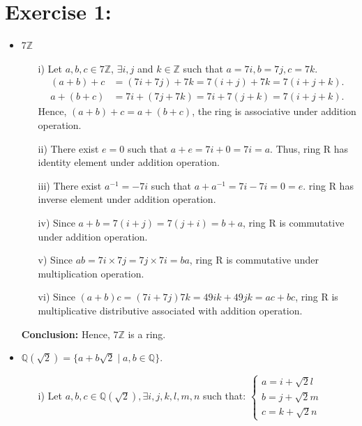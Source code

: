 \documentclass{article}
\newcommand{\Z}{\mathbb{Z}}
\newcommand{\Q}{\mathbb{Q}}
\begin{document}
	\section{Exercise 1:}
		\begin{itemize}
			\item 7$\Z$ \\
				\begin{enumerate}
					\item [i) ]
						Let $a, b, c \in 7\Z$, $\exists i, j$ and $k \in \Z$ such that $a = 7i, b = 7j, c = 7k$.
						\begin{align*}
							(a + b) + c &= (7i + 7j) + 7k = 7(i+j) + 7k = 7(i+j+k).\\
							a + (b + c) &= 7i + (7j + 7k) = 7i + 7(j+k) = 7(i+j+k).
						\end{align*}
						Hence, $(a + b) + c = a + (b + c)$, the ring is associative under addition operation.
					\item [ii)]
						There exist $e=0$ such that $a + e = 7i + 0 = 7i = a$. Thus, ring R has identity element under addition operation.
					\item [iii)]
						There exist $a^{-1} = -7i$ such that $a + a^{-1} = 7i - 7i = 0 = e$. ring R has inverse element under addition operation.
					\item [iv)]
						Since $a + b = 7(i+j) = 7(j+i) = b + a$, ring R is commutative under addition operation.
					\item [v)]
						Since $ab = 7i\times7j = 7j\times7i = ba$, ring R is commutative under multiplication operation.
					\item [vi)]
						Since $(a+b)c = (7i+7j)7k = 49ik + 49jk = ac + bc$, ring R is multiplicative distributive associated with addition operation.
				\end{enumerate}
				\textbf{Conclusion:} Hence, $7\Z$ is a ring.
			\item $\Q(\sqrt{2}) = \{a+b\sqrt{2} \; \vert \; a, b \in \Q\}.$\\
				\begin{enumerate}
					\item [i)]
						Let $a, b, c \in \Q(\sqrt{2}), \exists i,j,k,l,m,n$ such that:
						\begin{math}
							\begin{cases}
								a = i + \sqrt{2}l\\
								b = j + \sqrt{2}m\\
								c = k + \sqrt{2}n
							\end{cases}
						\end{math}\\

\end{enumerate}
\end{itemize}
\end{document}
